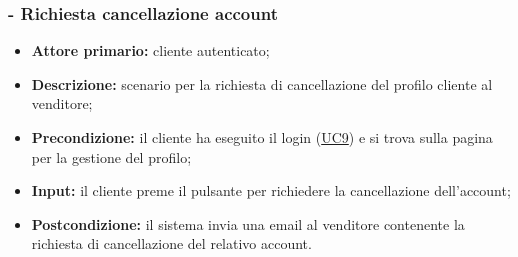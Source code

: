 \stepsubUserCase
\subsubsection{ - Richiesta cancellazione account}
\begin{itemize}
    \item \textbf{Attore primario:} cliente autenticato;
    \item \textbf{Descrizione:} scenario per la richiesta di cancellazione del profilo cliente al venditore;
    \item \textbf{Precondizione:} il cliente ha eseguito il login (\hyperref[UC9]{UC9}) e si trova sulla pagina per la gestione del profilo;
    \item \textbf{Input:} il cliente preme il pulsante per richiedere la cancellazione dell'account;
    \item \textbf{Postcondizione:} il sistema invia una email al venditore contenente la richiesta di cancellazione del relativo account.
\end{itemize}

\stepsubUserCase

